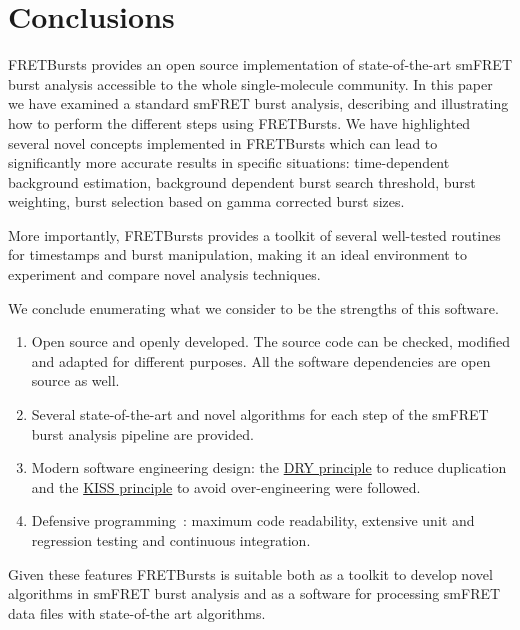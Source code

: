 \section{Conclusions}
\label{sec:conclusions}

FRETBursts provides an open source implementation of state-of-the-art smFRET burst analysis 
accessible to the whole single-molecule community.
In this paper we have examined a standard smFRET burst analysis, describing
and illustrating how to perform the different steps using FRETBursts.
We have highlighted several novel concepts implemented in FRETBursts which
can lead to significantly more accurate results in specific situations:
time-dependent background estimation, background dependent burst search threshold,
burst weighting, burst selection based on gamma corrected burst sizes.

More importantly, FRETBursts provides a toolkit of several well-tested routines
for timestamps and burst manipulation, making it an ideal environment to 
experiment and compare novel analysis techniques.

We conclude enumerating what we consider to be the strengths
of this software.

\begin{enumerate}
\item Open source and openly developed. The source code can be checked, modified and
adapted for different purposes. All the software dependencies are open source as well.
\item Several state-of-the-art and novel algorithms for each step of the
smFRET burst analysis pipeline are provided.
\item Modern software engineering design: the
\href{http://en.wikipedia.org/wiki/Don\%27t_repeat_yourself}{DRY principle}
to reduce duplication and the
\href{http://en.wikipedia.org/wiki/KISS_principle}{KISS principle}
to avoid over-engineering were followed.
\item Defensive programming~\cite{Prli__2012}: maximum code readability,
extensive unit and regression testing and continuous integration.
\end{enumerate}

Given these features FRETBursts is suitable both as a toolkit to develop novel algorithms
in smFRET burst analysis and as a software for processing smFRET data files with
state-of-the art algorithms.

